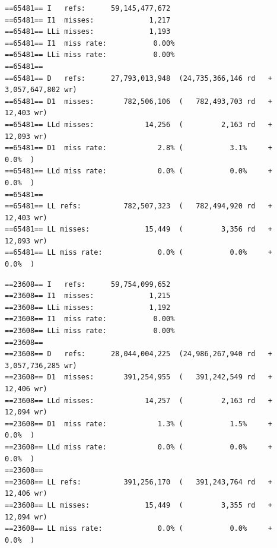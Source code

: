 \documentclass{report}
\begin{document}
\begin{lstlisting}[style=customv,caption=Version 1 Cachegrind]
==65481== I   refs:      59,145,477,672
==65481== I1  misses:             1,217
==65481== LLi misses:             1,193
==65481== I1  miss rate:           0.00%
==65481== LLi miss rate:           0.00%
==65481==
==65481== D   refs:      27,793,013,948  (24,735,366,146 rd   + 3,057,647,802 wr)
==65481== D1  misses:       782,506,106  (   782,493,703 rd   +        12,403 wr)
==65481== LLd misses:            14,256  (         2,163 rd   +        12,093 wr)
==65481== D1  miss rate:            2.8% (           3.1%     +           0.0%  )
==65481== LLd miss rate:            0.0% (           0.0%     +           0.0%  )
==65481==
==65481== LL refs:          782,507,323  (   782,494,920 rd   +        12,403 wr)
==65481== LL misses:             15,449  (         3,356 rd   +        12,093 wr)
==65481== LL miss rate:             0.0% (           0.0%     +           0.0%  )
\end{lstlisting}
\begin{lstlisting}[style=customv,caption=Version 2 Cachegrind]
==23608== I   refs:      59,754,099,652
==23608== I1  misses:             1,215
==23608== LLi misses:             1,192
==23608== I1  miss rate:           0.00%
==23608== LLi miss rate:           0.00%
==23608==
==23608== D   refs:      28,044,004,225  (24,986,267,940 rd   + 3,057,736,285 wr)
==23608== D1  misses:       391,254,955  (   391,242,549 rd   +        12,406 wr)
==23608== LLd misses:            14,257  (         2,163 rd   +        12,094 wr)
==23608== D1  miss rate:            1.3% (           1.5%     +           0.0%  )
==23608== LLd miss rate:            0.0% (           0.0%     +           0.0%  )
==23608==
==23608== LL refs:          391,256,170  (   391,243,764 rd   +        12,406 wr)
==23608== LL misses:             15,449  (         3,355 rd   +        12,094 wr)
==23608== LL miss rate:             0.0% (           0.0%     +           0.0%  )
\end{lstlisting}
\end{document}
